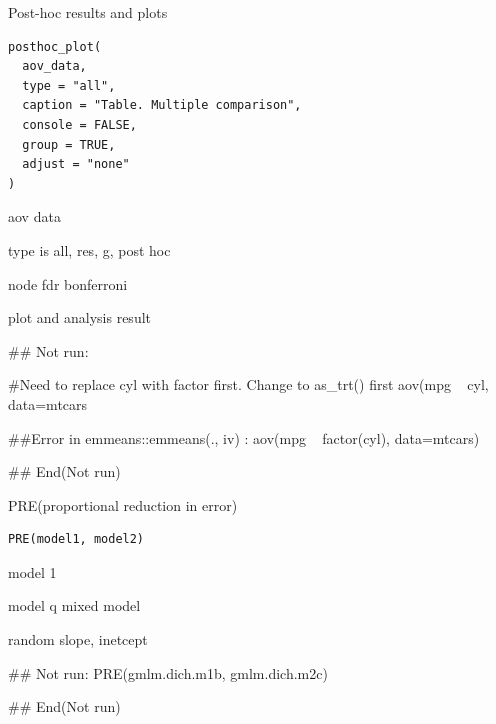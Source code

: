 \documentclass[a4paper]{book}
\begin{document}
%
\begin{Description}
Post-hoc results and plots
\end{Description}
%
\begin{Usage}
\begin{verbatim}
posthoc_plot(
  aov_data,
  type = "all",
  caption = "Table. Multiple comparison",
  console = FALSE,
  group = TRUE,
  adjust = "none"
)
\end{verbatim}
\end{Usage}
%
\begin{Arguments}
\begin{ldescription}
\item[\code{aov\_data}] aov data

\item[\code{type}] type is all, res, g, post hoc

\item[\code{adjust}] node fdr bonferroni
\end{ldescription}
\end{Arguments}
%
\begin{Value}
plot and analysis result
\end{Value}
%
\begin{Examples}
\begin{ExampleCode}

\#\# Not run: 

#Need to replace cyl with factor first. Change to as_trt() first
aov(mpg ~ cyl, data=mtcars %

##Error in emmeans::emmeans(., iv) :
aov(mpg ~ factor(cyl), data=mtcars)%


## End(Not run)

\end{ExampleCode}
\end{Examples}

%
\begin{Description}
PRE(proportional reduction in error)
\end{Description}
%
\begin{Usage}
\begin{verbatim}
PRE(model1, model2)
\end{verbatim}
\end{Usage}
%
\begin{Arguments}
\begin{ldescription}
\item[\code{model1}] model 1

\item[\code{model2}] model q mixed model
\end{ldescription}
\end{Arguments}
%
\begin{Value}
random slope, inetcept
\end{Value}
%
\begin{Examples}
\begin{ExampleCode}
\#\# Not run: 
 PRE(gmlm.dich.m1b, gmlm.dich.m2c)

## End(Not run)
\end{ExampleCode}
\end{Examples}
\end{document}
